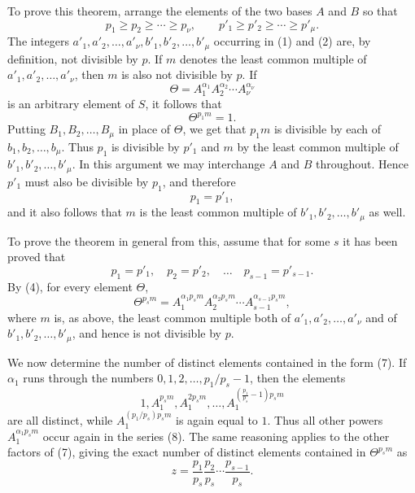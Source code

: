 \documentclass[11pt]{article}
\begin{document}
To prove this theorem, arrange the elements of the two bases $A$ and $B$ so that
\begin{equation}
p_1\ge p_2\ge\cdots\ge p_\nu,
\qquad
p'_1\ge p'_2\ge\cdots\ge p'_\mu.
\tag{3}
\end{equation}
The integers $a'_1,a'_2,
\ldots,a'_\nu,b'_1,b'_2,
\ldots,b'_\mu$ occurring in (1) and (2) are, by definition, not divisible by $p$. If $m$ denotes the least common multiple of $a'_1,a'_2,
\ldots,a'_\nu$, then $m$ is also not divisible by $p$. If
\begin{equation}
\Theta=A_1^{\alpha_1}A_2^{\alpha_2}\cdots A_\nu^{\alpha_\nu}
\tag{4}
\end{equation}
is an arbitrary element of $S$, it follows that
\[
\Theta^{p_1m}=1.
\]
Putting $B_1,B_2,
\ldots,B_\mu$ in place of $\Theta$, we get that $p_1m$ is divisible by each of $b_1,b_2,
\ldots,b_\mu$. Thus $p_1$ is divisible by $p'_1$ and $m$ by the least common multiple of $b'_1,b'_2,
\ldots,b'_\mu$. In this argument we may interchange $A$ and $B$ throughout. Hence $p'_1$ must also be divisible by $p_1$, and therefore
\begin{equation}
p_1=p'_1,
\tag{5}
\end{equation}
and it also follows that $m$ is the least common multiple of $b'_1,b'_2,
\ldots,b'_\mu$ as well.

To prove the theorem in general from this, assume that for some $s$ it has been proved that
\begin{equation}
p_1=p'_1,
\quad p_2=p'_2,
\quad\ldots\quad
p_{s-1}=p'_{s-1}.
\tag{6}
\end{equation}
By (4), for every element $\Theta$,
\begin{equation}
\Theta^{p_sm}
=A_1^{\alpha_1p_sm}A_2^{\alpha_2p_sm}\cdots A_{s-1}^{\alpha_{s-1}p_sm},
\tag{7}
\end{equation}
where $m$ is, as above, the least common multiple both of $a'_1,a'_2,
\ldots,a'_\nu$ and of $b'_1,b'_2,
\ldots,b'_\mu$, and hence is not divisible by $p$.

We now determine the number of distinct elements contained in the form (7). If $\alpha_1$ runs through the numbers $0,1,2,
\ldots,p_1/p_s-1$, then the elements
\begin{equation}
1,
A_1^{p_sm},
A_1^{2p_sm},
\ldots,
A_1^{\left(\frac{p_1}{p_s}-1\right)p_sm}
\tag{8}
\end{equation}
are all distinct, while $A_1^{(p_1/p_s)p_sm}$ is again equal to $1$. Thus all other powers $A_1^{\alpha_1p_sm}$ occur again in the series (8). The same reasoning applies to the other factors of (7), giving the exact number of distinct elements contained in $\Theta^{p_sm}$ as
\begin{equation}
z=\frac{p_1}{p_s}\frac{p_2}{p_s}\cdots\frac{p_{s-1}}{p_s}.
\tag{9}
\end{equation}
\end{document}
